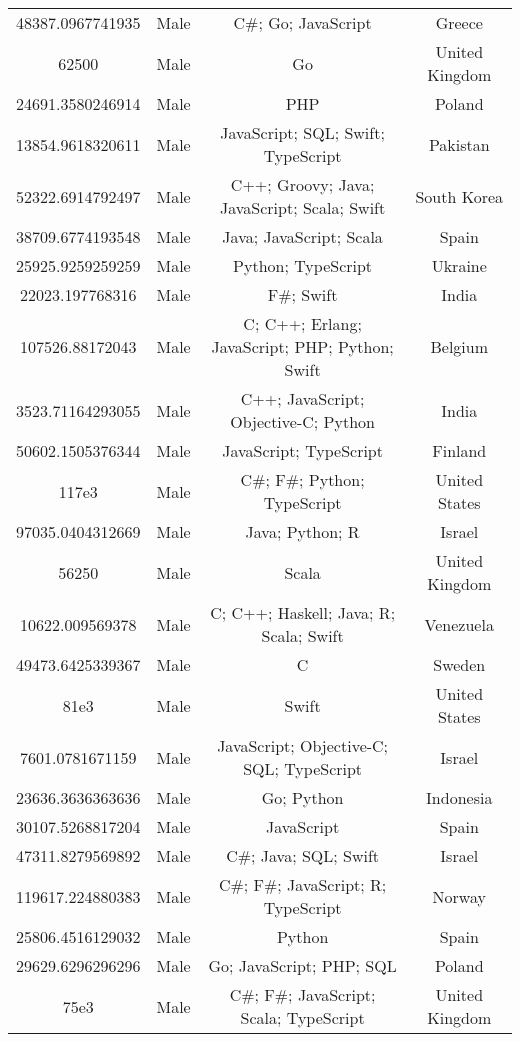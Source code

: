 \begin{center}
\begin{tabular}{ |c|c|c|c| }
48387.0967741935  &  Male  &  C\#; Go; JavaScript  &  Greece  \\ 
62500  &  Male  &  Go  &  United Kingdom  \\ 
24691.3580246914  &  Male  &  PHP  &  Poland  \\ 
13854.9618320611  &  Male  &  JavaScript; SQL; Swift; TypeScript  &  Pakistan  \\ 
52322.6914792497  &  Male  &  C++; Groovy; Java; JavaScript; Scala; Swift  &  South Korea  \\ 
38709.6774193548  &  Male  &  Java; JavaScript; Scala  &  Spain  \\ 
25925.9259259259  &  Male  &  Python; TypeScript  &  Ukraine  \\ 
22023.197768316  &  Male  &  F\#; Swift  &  India  \\ 
107526.88172043  &  Male  &  C; C++; Erlang; JavaScript; PHP; Python; Swift  &  Belgium  \\ 
3523.71164293055  &  Male  &  C++; JavaScript; Objective-C; Python  &  India  \\ 
50602.1505376344  &  Male  &  JavaScript; TypeScript  &  Finland  \\ 
117e3  &  Male  &  C\#; F\#; Python; TypeScript  &  United States  \\ 
97035.0404312669  &  Male  &  Java; Python; R  &  Israel  \\ 
56250  &  Male  &  Scala  &  United Kingdom  \\ 
10622.009569378  &  Male  &  C; C++; Haskell; Java; R; Scala; Swift  &  Venezuela  \\ 
49473.6425339367  &  Male  &  C  &  Sweden  \\ 
81e3  &  Male  &  Swift  &  United States  \\ 
7601.0781671159  &  Male  &  JavaScript; Objective-C; SQL; TypeScript  &  Israel  \\ 
23636.3636363636  &  Male  &  Go; Python  &  Indonesia  \\ 
30107.5268817204  &  Male  &  JavaScript  &  Spain  \\ 
47311.8279569892  &  Male  &  C\#; Java; SQL; Swift  &  Israel  \\ 
119617.224880383  &  Male  &  C\#; F\#; JavaScript; R; TypeScript  &  Norway  \\ 
25806.4516129032  &  Male  &  Python  &  Spain  \\ 
29629.6296296296  &  Male  &  Go; JavaScript; PHP; SQL  &  Poland  \\ 
75e3  &  Male  &  C\#; F\#; JavaScript; Scala; TypeScript  &  United Kingdom  \\ 

\end{tabular}
\end{center}
